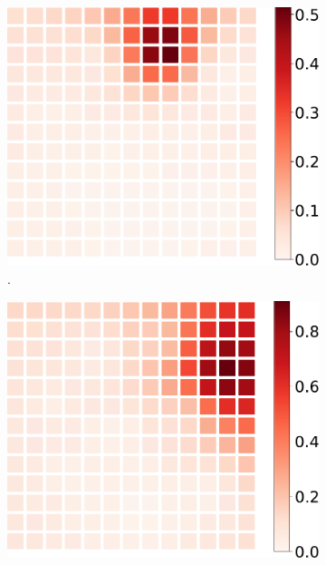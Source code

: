 \begin{figure}%
  \centering%
  \begin{subfigure}[t]{0.31\textwidth}%
    \centering%
    \includegraphics[width=\textwidth]{images/motor_unit_assignment/MU_fibre_distribution_13x13_10_fibers_mu3.pdf}%
    \caption{.}%
    \label{fig:MU_fibre_distribution_13x13_10_fibers_mu3}%
  \end{subfigure}
  \quad
  \begin{subfigure}[t]{0.31\textwidth}%
    \centering%
    \includegraphics[width=\textwidth]{images/motor_unit_assignment/MU_fibre_distribution_13x13_10_fibers_mu9.pdf}%

\end{subfigure}
\end{figure}
